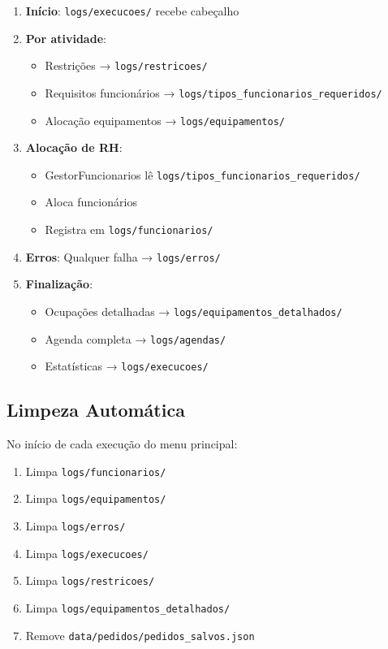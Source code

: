 \documentclass[11pt,a4paper]{article}
\begin{document}
\begin{enumerate}
    \item \textbf{Início}: \texttt{logs/execucoes/} recebe cabeçalho
    \item \textbf{Por atividade}:
    \begin{itemize}
        \item Restrições → \texttt{logs/restricoes/}
        \item Requisitos funcionários → \texttt{logs/tipos\_funcionarios\_requeridos/}
        \item Alocação equipamentos → \texttt{logs/equipamentos/}
    \end{itemize}
    \item \textbf{Alocação de RH}:
    \begin{itemize}
        \item GestorFuncionarios lê \texttt{logs/tipos\_funcionarios\_requeridos/}
        \item Aloca funcionários
        \item Registra em \texttt{logs/funcionarios/}
    \end{itemize}
    \item \textbf{Erros}: Qualquer falha → \texttt{logs/erros/}
    \item \textbf{Finalização}:
    \begin{itemize}
        \item Ocupações detalhadas → \texttt{logs/equipamentos\_detalhados/}
        \item Agenda completa → \texttt{logs/agendas/}
        \item Estatísticas → \texttt{logs/execucoes/}
    \end{itemize}
\end{enumerate}

\subsection{Limpeza Automática}

No início de cada execução do menu principal:

\begin{enumerate}
    \item Limpa \texttt{logs/funcionarios/}
    \item Limpa \texttt{logs/equipamentos/}
    \item Limpa \texttt{logs/erros/}
    \item Limpa \texttt{logs/execucoes/}
    \item Limpa \texttt{logs/restricoes/}
    \item Limpa \texttt{logs/equipamentos\_detalhados/}
    \item Remove \texttt{data/pedidos/pedidos\_salvos.json}
\end{enumerate}
\end{document}
